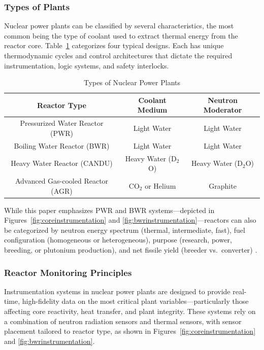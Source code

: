 \documentclass[12pt]{article}
\begin{document}
\subsubsection*{Types of Plants}

Nuclear power plants can be classified by several characteristics, the most common being the type of coolant used to extract thermal energy from the reactor core. Table~\ref{tab:planttypes} categorizes four typical designs. Each has unique thermodynamic cycles and control architectures that dictate the required instrumentation, logic systems, and safety interlocks.

\begin{table}[H]
  \centering
  \caption{Types of Nuclear Power Plants \cite{ichandbook}}
  \label{tab:planttypes}
  \begin{tabular}{|c|c|c|}
    \hline
    \textbf{Reactor Type} & \textbf{Coolant Medium} & \textbf{Neutron Moderator} \\
    \hline
    Pressurized Water Reactor (PWR) & Light Water & Light Water \\
    Boiling Water Reactor (BWR) & Light Water & Light Water \\
    Heavy Water Reactor (CANDU) & Heavy Water (D$_2$O) & Heavy Water (D$_2$O) \\
    Advanced Gas-cooled Reactor (AGR) & CO$_2$ or Helium & Graphite \\
    \hline
  \end{tabular}
\end{table}

While this paper emphasizes PWR and BWR systems—depicted in Figures~\ref{fig:coreinstrumentation} and \ref{fig:bwrinstrumentation}—reactors can also be categorized by neutron energy spectrum (thermal, intermediate, fast), fuel configuration (homogeneous or heterogeneous), purpose (research, power, breeding, or plutonium production), and net fissile yield (breeder vs.\ converter) \cite{ichandbook}.

\subsubsection*{Reactor Monitoring Principles}

Instrumentation systems in nuclear power plants are designed to provide real-time, high-fidelity data on the most critical plant variables—particularly those affecting core reactivity, heat transfer, and plant integrity. These systems rely on a combination of neutron radiation sensors and thermal sensors, with sensor placement tailored to reactor type, as shown in Figures~\ref{fig:coreinstrumentation} and \ref{fig:bwrinstrumentation}.
\end{document}
